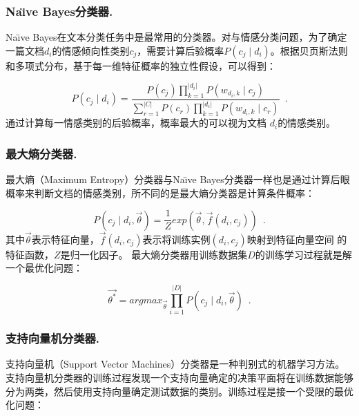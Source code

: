 \subsubsection{Na\"\i ve Bayes分类器.}
\label{bayes}

Na\"\i ve Bayes在文本分类任务中是最常用的分类器。对与情感分类问题，为了确定一篇文档$ d_{i}$的情感倾向性类别$ c_{j} $，需要计算后验概率$ P \left(c_{j} \mid d_{i} \right)$。根据贝页斯法则和多项式分布，基于每一维特征概率的独立性假设，可以得到：

\begin{equation}
\label{e4}
P \left(c_{j} \mid d_{i} \right) = \frac{P \left( c_{j} \right)\prod_{k=1}^{| d_{i} |} P \left( w_{d_{i},k} \mid c_{j} \right)}{\sum_{r=1}^{|C|}P \left( c_{r} \right)\prod_{k=1}^{| d_{i} |} P \left( w_{d_{i},k} \mid c_{r} \right)} \enspace .
\end{equation}
通过计算每一情感类别的后验概率，概率最大的可以视为文档 $ d_{i} $的情感类别。

\subsubsection{最大熵分类器.}
\label{entropy}
最大熵（Maximum Entropy）分类器与Na\"\i ve Bayes分类器一样也是通过计算后眼概率来判断文档的情感类别，所不同的是最大熵分类器是计算条件概率：

\begin{equation}
\label{e5}
P \left( c_{j} \mid d_{i}, \overrightarrow{\theta} \right) = \frac{1}{Z}exp \left( \overrightarrow{\theta}, \overrightarrow{f} \left( d_{i},c_{j} \right) \right) \enspace .
\end{equation}
其中$ \overrightarrow{\theta} $表示特征向量，$ \overrightarrow{f} \left( d_{i}, c_{j} \right)$表示将训练实例$ \left( d_{i}, c_{j} \right) $映射到特征向量空间 的特征函数，$ Z $是归一化因子。
最大熵分类器用训练数据集$ D $的训练学习过程就是解一个最优化问题：

\begin{equation}
\label{e6}
\overrightarrow{\theta^{\ast}}=argmax_{\overrightarrow{\theta}}\prod_{i=1}^{|D|} P \left( c_{j} \mid d_{i}, \overrightarrow{\theta} \right) \enspace .
\end{equation} 

\subsubsection{支持向量机分类器.}
\label{svm}
支持向量机（Support Vector Machines）分类器是一种判别式的机器学习方法。支持向量机分类器的训练过程发现一个支持向量确定的决策平面将在训练数据能够分为两类，然后使用支持向量确定测试数据的类别。训练过程是接一个受限的最优化问题：

